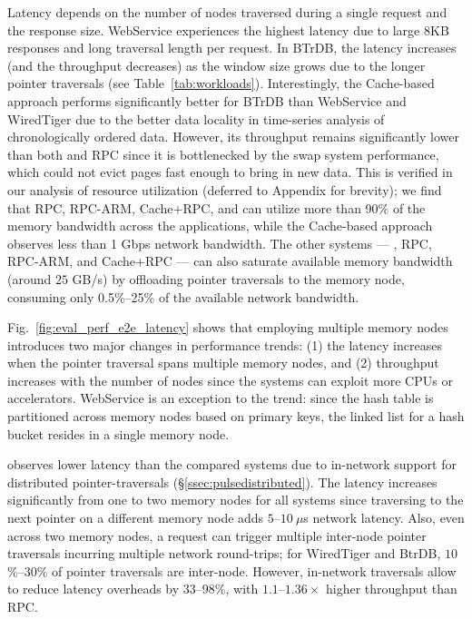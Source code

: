 Latency depends on the number of nodes traversed during a single request and the response size. WebService experiences the highest latency due to large 8KB responses and long traversal length per request. In BTrDB, the latency increases (and the throughput decreases) as the window size grows due to the longer pointer traversals (see Table~\ref{tab:workloads}). Interestingly, the Cache-based approach performs significantly better for BTrDB than WebService and WiredTiger due to the better data locality in time-series analysis of chronologically ordered data. However, its throughput remains significantly lower than both \pulse and RPC since it is bottlenecked by the swap system performance, which could not evict pages fast enough to bring in new data. This is verified in our analysis of resource utilization (deferred to Appendix for brevity); we find that RPC, RPC-ARM, Cache$+$RPC, and \pulse can utilize more than 90\% of the memory bandwidth across the applications, while the Cache-based approach observes less than 1 Gbps network bandwidth. The other systems --- \pulse, RPC, RPC-ARM, and Cache$+$RPC --- can also saturate available memory bandwidth (around $25$ GB/s) by offloading pointer traversals to the memory node, consuming only 0.5\%--25\% of the available network bandwidth. 

 Fig.~\ref{fig:eval_perf_e2e_latency} shows that employing multiple memory nodes introduces two major changes in performance trends: (1) the latency increases when the pointer traversal spans multiple memory nodes, and (2) throughput increases with the number of nodes since the systems can exploit more CPUs or accelerators. WebService is an exception to the trend: since the hash table is partitioned across memory nodes based on primary keys, the linked list for a hash bucket resides in a single memory node. 

\pulse observes lower latency than the compared systems due to in-network support for distributed pointer-traversals (\S\ref{ssec:pulsedistributed}). The latency increases significantly from one to two memory nodes for all systems since traversing to the next pointer on a different memory node adds $5$--$10~\mu$s network latency. Also, even across two memory nodes, a request can trigger multiple inter-node pointer traversals incurring multiple network round-trips; for WiredTiger and BtrDB, $10$\%--$30$\% of pointer traversals are inter-node. However, in-network traversals allow \pulse to reduce latency overheads by $33$--$98$\%, with $1.1$--$1.36\times$ higher throughput than RPC.




